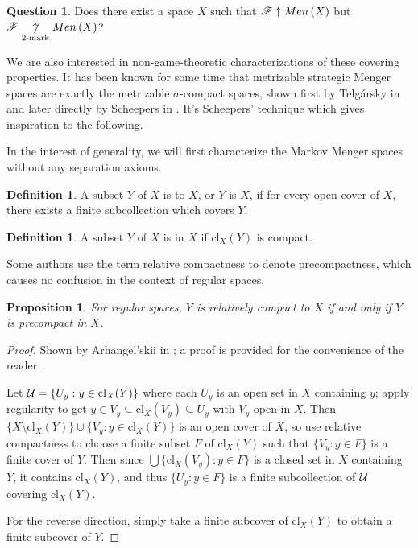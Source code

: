 \documentclass{amsart}
\newtheorem{proposition}[theorem]{Proposition}
\theoremstyle{definition}
\newtheorem{definition}[theorem]{Definition}
\newtheorem{question}[theorem]{Question}
\begin{document}
\begin{question}\label{perfectTo2Mark}
  Does there exist a space \(X\) such that \(\mathscr{F} \uparrow Men\left({X}\right)\) but
  \(\mathscr{F} \underset{2\text{-mark}}{\not\uparrow} Men\left({X}\right)\)?
\end{question}

We are also interested in non-game-theoretic characterizations of these
covering properties. It has been known for some time that metrizable strategic
Menger spaces are exactly the metrizable \(\sigma\)-compact spaces, shown first
by Telg\'arsky in \cite{MR753073} and later directly by Scheepers in
\cite{MR1273523}. It's Scheepers' technique which gives inspiration to
the following.

In the interest of generality, we will first characterize the Markov Menger
spaces without any separation axioms.

\begin{definition}
  A subset \(Y\) of \(X\) is  to \(X\), or
  \(Y\) is  \(X\), if for every open
  cover of \(X\), there exists a finite subcollection which covers \(Y\).
\end{definition}

\begin{definition}
  A subset \(Y\) of \(X\) is  in \(X\) if
  \(\text{cl}_X(Y)\) is compact.
\end{definition}

Some authors use the term
relative compactness to denote precompactness, which causes
no confusion in the context of regular spaces.

\begin{proposition}
  For regular spaces, \(Y\) is relatively compact to \(X\) if and only if
  \(Y\) is precompact in \(X\).
\end{proposition}

\begin{proof}
  Shown by Arhangel'skii in \cite{MR1885790}; a proof is provided for the
  convenience of the reader.

  Let \(\mathcal{U}=\{U_y:y\in\text{cl}_X(Y)\}\) where each \(U_y\) is an open
  set in \(X\) containing \(y\); apply regularity to get
  \(y\in V_{y}\subseteq\text{cl}_X(V_{y})\subseteq U_{y}\)
  with \(V_{y}\) open in \(X\).
  Then \(\{X\setminus\text{cl}_X(Y)\}\cup\{V_{y}:y\in \text{cl}_X(Y)\}\)
  is an open cover of \(X\), so
  use relative compactness to choose a finite subset \(F\) of \(\text{cl}_X(Y)\)
  such that \(\{V_{y}:y\in F\}\) is a finite cover of \(Y\). Then since
  \(\bigcup\{\text{cl}_X(V_{y}):y\in F\}\) is a closed set in \(X\)
  containing \(Y\), it contains \(\text{cl}_X(Y)\), and thus
  \(\{U_{y}:y\in F\}\) is a finite subcollection of \(\mathcal{U}\) covering
  \(\text{cl}_X(Y)\).

  For the reverse direction, simply take a finite subcover of
  \(\text{cl}_X(Y)\) to obtain a finite subcover of \(Y\).
\end{proof}
\end{document}
